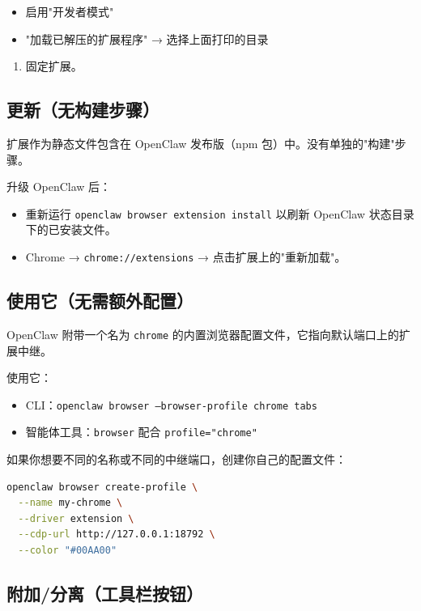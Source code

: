 \begin{itemize}
  \item 启用"开发者模式"
  \item "加载已解压的扩展程序" → 选择上面打印的目录
\end{itemize}


\begin{enumerate}
  \item 固定扩展。
\end{enumerate}


\subsection{更新（无构建步骤）}


扩展作为静态文件包含在 OpenClaw 发布版（npm 包）中。没有单独的"构建"步骤。

升级 OpenClaw 后：

\begin{itemize}
  \item 重新运行 \texttt{openclaw browser extension install} 以刷新 OpenClaw 状态目录下的已安装文件。
  \item Chrome → \texttt{chrome://extensions} → 点击扩展上的"重新加载"。
\end{itemize}


\subsection{使用它（无需额外配置）}


OpenClaw 附带一个名为 \texttt{chrome} 的内置浏览器配置文件，它指向默认端口上的扩展中继。

使用它：

\begin{itemize}
  \item CLI：\texttt{openclaw browser --browser-profile chrome tabs}
  \item 智能体工具：\texttt{browser} 配合 \texttt{profile="chrome"}
\end{itemize}


如果你想要不同的名称或不同的中继端口，创建你自己的配置文件：

\begin{lstlisting}[language=bash]
openclaw browser create-profile \
  --name my-chrome \
  --driver extension \
  --cdp-url http://127.0.0.1:18792 \
  --color "#00AA00"
\end{lstlisting}


\subsection{附加/分离（工具栏按钮）}


